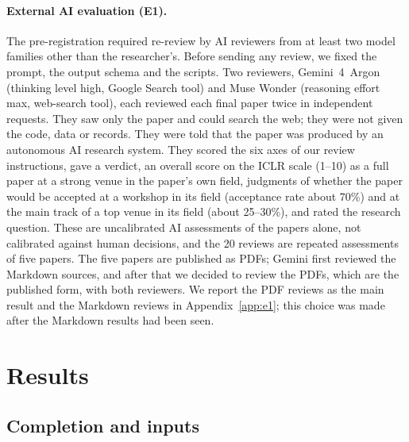 \documentclass[11pt]{article}
\begin{document}
\paragraph{External AI evaluation (E1).} The pre-registration required re-review by AI reviewers from at least two model families other than the researcher's. Before sending any review, we fixed the prompt, the output schema and the scripts. Two reviewers, Gemini~4~Argon (thinking level high, Google Search tool) and Muse Wonder (reasoning effort max, web-search tool), each reviewed each final paper twice in independent requests. They saw only the paper and could search the web; they were not given the code, data or records. They were told that the paper was produced by an autonomous AI research system. They scored the six axes of our review instructions, gave a verdict, an overall score on the ICLR scale (1--10) as a full paper at a strong venue in the paper's own field, judgments of whether the paper would be accepted at a workshop in its field (acceptance rate about 70\%) and at the main track of a top venue in its field (about 25--30\%), and rated the research question. These are uncalibrated AI assessments of the papers alone, not calibrated against human decisions, and the 20 reviews are repeated assessments of five papers. The five papers are published as PDFs; Gemini first reviewed the Markdown sources, and after that we decided to review the PDFs, which are the published form, with both reviewers. We report the PDF reviews as the main result and the Markdown reviews in Appendix~\ref{app:e1}; this choice was made after the Markdown results had been seen.

\section{Results}
\label{sec:results}

\subsection{Completion and inputs}
\label{sec:res-ops}
\end{document}
